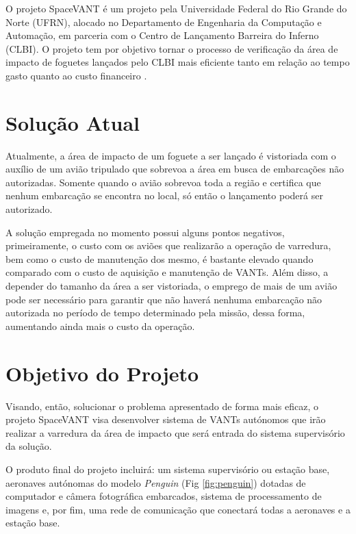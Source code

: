 \label{Cap:SpaceVANT}

O projeto SpaceVANT é um projeto pela Universidade Federal do Rio Grande do Norte (UFRN), alocado no Departamento de Engenharia da Computação e Automação, em parceria com o Centro de Lançamento Barreira do Inferno (CLBI). O projeto tem por objetivo tornar o processo de verificação da área de impacto de foguetes lançados pelo CLBI mais eficiente tanto em relação ao tempo gasto quanto ao custo financeiro \cite{everaerts2008use}.

\section{Solução Atual}

Atualmente, a área de impacto de um foguete a ser lançado é vistoriada com o auxílio de um avião tripulado que sobrevoa a área em busca de embarcações não autorizadas. Somente quando o avião sobrevoa toda a região e certifica que nenhum embarcação se encontra no local, só então o lançamento poderá ser autorizado.

A solução empregada no momento possui alguns pontos negativos, primeiramente, o custo com os aviões que realizarão a operação de varredura, bem como o custo de manutenção dos mesmo, é bastante elevado quando comparado com o custo de aquisição e manutenção de VANTs. Além disso, a depender do tamanho da área a ser vistoriada, o emprego de mais de um avião pode ser necessário para garantir que não haverá nenhuma embarcação não autorizada no período de tempo determinado pela missão, dessa forma, aumentando ainda mais o custo da operação.

\section{Objetivo do Projeto}


Visando, então, solucionar o problema apresentado de forma mais eficaz, o projeto SpaceVANT visa desenvolver sistema de VANTs autónomos que irão realizar a varredura da área de impacto que será entrada do sistema supervisório da solução.

O produto final do projeto incluirá: um sistema supervisório ou estação base, aeronaves autónomas do modelo \emph{Penguin} (Fig \ref{fig:penguin}) dotadas de computador e câmera fotográfica embarcados, sistema de processamento de imagens e, por fim, uma rede de comunicação que conectará todas a aeronaves e a estação base. 

